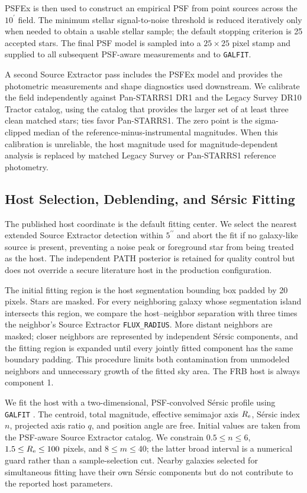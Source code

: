 \documentclass[10pt,twocolumn]{article}
\newcommand{\arcmin}{^{\prime}}
\newcommand{\arcsec}{^{\prime\prime}}
\begin{document}
PSFEx \citep{2011ASPC..442..435B} is then used to construct an empirical PSF
from point sources across the $10\arcmin$ field.  The minimum stellar
signal-to-noise threshold is reduced iteratively only when needed to obtain a
usable stellar sample; the default stopping criterion is 25 accepted stars.
The final PSF model is sampled into a $25\times25$ pixel stamp and supplied to
all subsequent PSF-aware measurements and to \texttt{GALFIT}.

A second Source Extractor pass includes the PSFEx model and provides the
photometric measurements and shape diagnostics used downstream.  We
calibrate the field independently against Pan-STARRS1 DR1 and the Legacy
Survey DR10 Tractor catalog, using the catalog that provides the larger set of
at least three clean matched stars; ties favor Pan-STARRS1.  The zero point is
the sigma-clipped median of the reference-minus-instrumental magnitudes.
When this calibration is unreliable, the host magnitude used for
magnitude-dependent analysis is replaced by matched Legacy Survey or
Pan-STARRS1 reference photometry.

\subsection{Host Selection, Deblending, and S\'ersic Fitting}
\label{subsec:galfit}

The published host coordinate is the default fitting center.  We select the
nearest extended Source Extractor detection within $5\arcsec$ and abort the
fit if no galaxy-like source is present, preventing a noise peak or foreground
star from being treated as the host.  The independent PATH posterior is
retained for quality control but does not override a secure literature host
in the production configuration.

The initial fitting region is the host segmentation bounding box padded by 20
pixels.  Stars are masked.  For every neighboring galaxy whose segmentation
island intersects this region, we compare the host--neighbor separation with
three times the neighbor's Source Extractor \texttt{FLUX\_RADIUS}.  More
distant neighbors are masked; closer neighbors are represented by independent
S\'ersic components, and the fitting region is expanded until every jointly
fitted component has the same boundary padding.  This procedure limits both
contamination from unmodeled neighbors and unnecessary growth of the fitted
sky area.  The FRB host is always component 1.

We fit the host with a two-dimensional, PSF-convolved S\'ersic profile using
\texttt{GALFIT} \citep{2002AJ....124..266P,2010AJ....139.2097P}.  The
centroid, total magnitude, effective semimajor axis $R_{\rm e}$, S\'ersic
index $n$, projected axis ratio $q$, and position angle are free.  Initial
values are taken from the PSF-aware Source Extractor catalog.  We constrain
$0.5\leq n\leq6$, $1.5\leq R_{\rm e}\leq100$ pixels, and
$8\leq m\leq40$; the latter broad interval is a numerical guard rather than a
sample-selection cut.  Nearby galaxies selected for simultaneous fitting have
their own S\'ersic components but do not contribute to the reported host
parameters.
\end{document}
